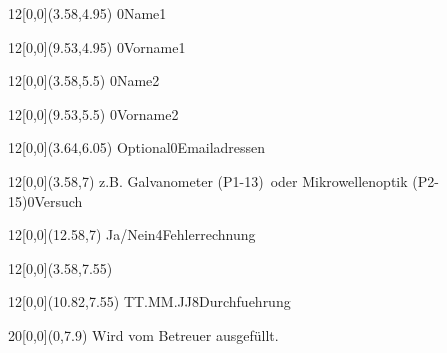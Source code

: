 \begin{titlepage}
    \begin{textblock}{12}[0,0](3.58,4.95)
                    {}{0}{Name1}
    \end{textblock}
    \begin{textblock}{12}[0,0](9.53,4.95)
                    {}{0}{Vorname1}
    \end{textblock}
    
    \begin{textblock}{12}[0,0](3.58,5.5)
                    {}{0}{Name2}
    \end{textblock}
    \begin{textblock}{12}[0,0](9.53,5.5)
                    {}{0}{Vorname2}
    \end{textblock}
    
    \begin{textblock}{12}[0,0](3.64,6.05)
       \normalsize{}
                              {Optional}{0}{Emailadressen}
    \end{textblock}
    
    \begin{textblock}{12}[0,0](3.58,7)
                    {z.B. \glqq Galvanometer (P1-13)\grqq\ oder \glqq %
                     Mikrowellenoptik (P2-15)\grqq}{0}{Versuch}
    \end{textblock}
    \begin{textblock}{12}[0,0](12.58,7)
                   {Ja/Nein}{4}{Fehlerrechnung}
    \end{textblock}
    
    \begin{textblock}{12}[0,0](3.58,7.55)
    \end{textblock}
    \begin{textblock}{12}[0,0](10.82,7.55)
                    {TT.MM.JJ}{8}{Durchfuehrung}
    \end{textblock}
    
    \begin{textblock}{20}[0,0](0,7.9)\tiny\centering
        Wird vom Betreuer ausgefüllt.
    \end{textblock}
    

\end{titlepage}
